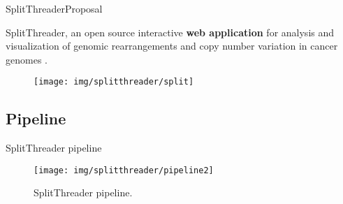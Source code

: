 \documentclass[10pt]{beamer}
\newcommand{\1}{
        	\setbeamertemplate{background}{
        		\texttt{[image: img/1\_BIO]}
        		\tikz[overlay] \fill[fill opacity=0.75,fill=white] (0,0) rectangle (-\paperwidth,\paperheight);
        	}
}
\begin{document}
\begin{frame}{SplitThreader}{Proposal}	
	\begin{block}{}
		SplitThreader, an open source interactive \textbf{web application} for analysis and visualization of genomic rearrangements and copy number	variation in cancer genomes \cite{nattestad2016splitthreader}.
	\end{block}	

	\begin{figure}
		\centering
		\texttt{[image: img/splitthreader/split]}
	\end{figure}	
\end{frame}


\subsection{Pipeline}


\begin{frame}{SplitThreader pipeline}{}	
	\begin{figure}[h]
		\centering
		\texttt{[image: img/splitthreader/pipeline2]}
		\caption{SplitThreader pipeline.}
		\label{fig:pipeline}
	\end{figure}	
\end{frame}
\end{document}
